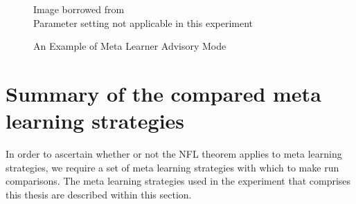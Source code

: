\begin{figure}[h]
\caption{An Example of Meta Learner Advisory Mode}
\centering
Image borrowed from \cite{Vilalta} \\
Parameter setting not applicable in this experiment
\end{figure}

\section{Summary of the compared meta learning strategies}
In order to ascertain whether or not the NFL theorem applies to meta learning strategies,
we require a set of meta learning strategies with which to make run comparisons. The
meta learning strategies used in the experiment that comprises this thesis are described within
this section.
